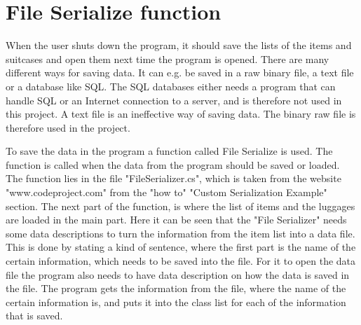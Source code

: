 \section{File Serialize function}
When the user shuts down the program, it should save the lists of the items and suitcases and open them next time the program is opened. There are many different ways for saving data. It can e.g. be saved in a raw binary file, a text file or a database like SQL.
The SQL databases either needs a program that can handle SQL or an Internet connection to a server, and is therefore not used in this project. A text file is an ineffective way of saving data. The binary raw file is therefore used in the project.

To save the data in the program a function called File Serialize is used. The function is called when the data from the program should be saved or loaded. The function lies in the file "FileSerializer.cs", which is taken from the website "www.codeproject.com" from the "how to" "Custom Serialization Example" section. The next part of the function, is where the list of items and the luggages are loaded in the main part. 
Here it can be seen that the "File Serializer" needs some data descriptions to turn the information from the item list into a data file. 
This is done by stating a kind of sentence, where the first part is the name of the certain information, which needs to be saved into the file. 
For it to open the data file the program also needs to have data description on how the data is saved in the file. The program gets the information from the file, where the name of the certain information is, and puts it into the class list for each of the information that is saved.